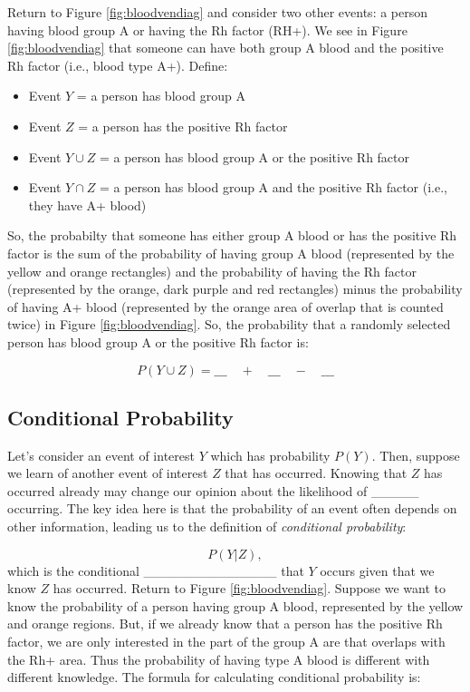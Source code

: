 \documentclass[]{book}
\providecommand{\tightlist}{%
  \setlength{\itemsep}{0pt}\setlength{\parskip}{0pt}}
\theoremstyle{definition}
\theoremstyle{definition}
\theoremstyle{remark}
\begin{document}
Return to Figure \ref{fig:bloodvendiag} and consider two other events: a
person having blood group A or having the Rh factor (RH+). We see in
Figure \ref{fig:bloodvendiag} that someone can have both group A blood
and the positive Rh factor (i.e., blood type A+). Define:

\begin{itemize}
\tightlist
\item
  Event \(Y\) = a person has blood group A
\item
  Event \(Z\) = a person has the positive Rh factor
\item
  Event \(Y \cup Z\) = a person has blood group A or the positive Rh
  factor
\item
  Event \(Y \cap Z\) = a person has blood group A and the positive Rh
  factor (i.e., they have A+ blood)
\end{itemize}

So, the probabilty that someone has either group A blood or has the
positive Rh factor is the sum of the probability of having group A blood
(represented by the yellow and orange rectangles) and the probability of
having the Rh factor (represented by the orange, dark purple and red
rectangles) minus the probability of having A+ blood (represented by the
orange area of overlap that is counted twice) in Figure
\ref{fig:bloodvendiag}. So, the probability that a randomly selected
person has blood group A or the positive Rh factor is:

\[ P(Y \cup Z) = \_\_\_ \quad + \quad \_\_\_ \quad - \quad \_\_\_\]

\subsection{Conditional Probability}\label{conditional-probability}

Let's consider an event of interest \(Y\) which has probability
\(P(Y)\). Then, suppose we learn of another event of interest \(Z\) that
has occurred. Knowing that \(Z\) has occurred already may change our
opinion about the likelihood of \_\_\_\_\_ occurring. The key idea here
is that the probability of an event often depends on other information,
leading us to the definition of \emph{conditional probability}:

\[ P(Y|Z), \] which is the conditional \_\_\_\_\_\_\_\_\_\_\_\_\_\_ that
\(Y\) occurs given that we know \(Z\) has occurred. Return to Figure
\ref{fig:bloodvendiag}. Suppose we want to know the probability of a
person having group A blood, represented by the yellow and orange
regions. But, if we already know that a person has the positive Rh
factor, we are only interested in the part of the group A are that
overlaps with the Rh+ area. Thus the probability of having type A blood
is different with different knowledge. The formula for calculating
conditional probability is:
\end{document}
